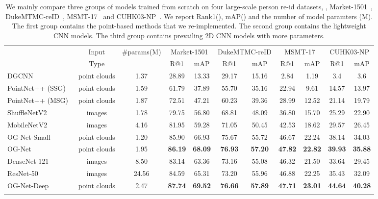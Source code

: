 \setlength{\tabcolsep}{5pt}
\begin{table*}
\scriptsize
\caption{We mainly compare three groups of models trained from scratch on four large-scale person re-id datasets, \ie, Market-1501~\cite{zheng2015scalable}, DukeMTMC-reID~\cite{ristani2016performance,zheng2017unlabeled}, MSMT-17~\cite{wei2018person} and CUHK03-NP~\cite{li2014deepreid,zhong2017re}. We report Rank1(), mAP() and the number of model paramters (M). The first group contains  the point-based methods that we re-implemented. The second group contains the lightweight CNN models. The third group contains prevailing 2D CNN models with more parameters. }
\begin{center}
\label{table:supervised}
\begin{tabular}{l|c|c|cc|cc|cc|cc}
\shline
\multirow{2}{*}{Method} & Input &\multirow{2}{*}{\#params(M)} & \multicolumn{2}{c|}{Market-1501} & \multicolumn{2}{c|}{DukeMTMC-reID} & \multicolumn{2}{c|}{MSMT-17} & \multicolumn{2}{c}{CUHK03-NP}\\
& Type & & R@1 & mAP & R@1 & mAP & R@1 & mAP & R@1 & mAP \\
\shline


DGCNN ~\cite{wang2019dynamic} & point clouds  & 1.37 & 28.89 & 13.33 & 29.17 & 15.16 & 2.84 & 1.19 & 3.4 & 3.6 \\
PointNet++ (SSG)~\cite{qi2017pointnet++} & point clouds & 1.59 & 61.79 & 37.89 & 55.70 & 35.16 & 22.94 & 9.61 & 14.57 & 13.97 \\
PointNet++ (MSG)~\cite{qi2017pointnet++} & point clouds  & 1.87 & 72.51 & 47.21 & 60.23 & 39.36 & 28.99 & 12.52 & 21.14 & 19.79\\
\hline
ShuffleNetV2~\cite{zhang2018shufflenet} & images & 1.78 & 79.75 & 56.80 & 68.81 & 48.09 & 36.80 & 15.70 & 25.29 & 22.90 \\
MobileNetV2~\cite{sandler2018mobilenetv2} & images & 4.16 & 81.95 & 59.28 & 71.05 & 50.45 & 42.53 & 18.62 & 29.57 & 26.45 \\
\hline
OG-Net-Small & point clouds & 1.20 & 85.90 & 66.93 & 75.67 & 55.72 & 46.67 & 22.24 & 38.14 & 34.03 \\
OG-Net & point clouds  & 1.95 & \textbf{86.19} & \textbf{68.09} & \textbf{76.93} & \textbf{57.20} & \textbf{47.82} & \textbf{22.82} & \textbf{39.93} & \textbf{35.88} \\
\shline
DenseNet-121~\cite{Huang2017Densely} & images & 8.50 & 83.14 & 63.36 & 73.16 & 55.08 & 46.32 & 21.50 & 33.64 & 29.45\\
ResNet-50~\cite{he2016deep} & images & 24.56 & 84.59 & 65.31 & 73.20 & 55.96 & 46.88 & 22.25 & 35.43 & 32.09\\
\hline
OG-Net-Deep & point clouds  & 2.47 & \textbf{87.74} & \textbf{69.52} & \textbf{76.66} & \textbf{57.89} & \textbf{47.71} & \textbf{23.01} & \textbf{44.64} & \textbf{40.28} \\
\shline
\end{tabular}
\end{center}
\end{table*}

